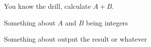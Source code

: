You know the drill, calculate $A + B$.

\InputFile

Something about $A$ and $B$ being integers 

\OutputFile

Something about output the result or whatever

\SAMPLES
